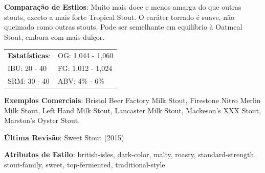 \textbf{Comparação de Estilos}: Muito mais doce e menos amarga do que outras stouts, exceto a mais forte Tropical Stout. O caráter torrado é suave, não queimado como outras stouts. Pode ser semelhante em equilíbrio à Oatmeal Stout, embora com mais dulçor.

\begin{tabular}{@{}p{35mm}p{35mm}@{}}
  \textbf{Estatísticas}: & OG: 1,044 - 1,060 \\
  IBU: 20 - 40  & FG: 1,012 - 1,024 \\
  SRM: 30 - 40  & ABV: 4\% - 6\%
\end{tabular}

\textbf{Exemplos Comerciais}: Bristol Beer Factory Milk Stout, Firestone Nitro Merlin Milk Stout, Left Hand Milk Stout, Lancaster Milk Stout, Mackeson's XXX Stout, Marston’s Oyster Stout.

\textbf{Última Revisão}: Sweet Stout (2015)

\textbf{Atributos de Estilo}: british-isles, dark-color, malty, roasty, standard-strength, stout-family, sweet, top-fermented, traditional-style
